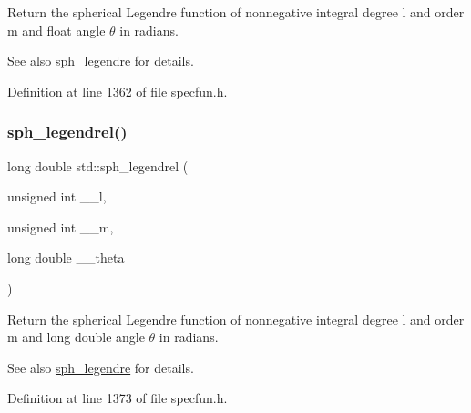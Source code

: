 Return the spherical Legendre function of nonnegative integral degree {\ttfamily l} and order {\ttfamily m} and float angle $ \theta $ in radians.

\begin{DoxySeeAlso}{See also}
\hyperlink{group__mathsf__std_gacef0d41a7ce572a9ace3437498794ed0}{sph\+\_\+legendre} for details. 
\end{DoxySeeAlso}


Definition at line 1362 of file specfun.\+h.

\mbox{\label{group__mathsf__std_ga2f6618dea1847f09fd67f3c974c1910d}} 
\subsubsection{\texorpdfstring{sph\+\_\+legendrel()}{sph\_legendrel()}}
{\footnotesize\ttfamily long double std\+::sph\+\_\+legendrel (\begin{DoxyParamCaption}\item[{unsigned int}]{\+\_\+\+\_\+l,  }\item[{unsigned int}]{\+\_\+\+\_\+m,  }\item[{long double}]{\+\_\+\+\_\+theta }\end{DoxyParamCaption})\hspace{0.3cm}{\ttfamily [inline]}}

Return the spherical Legendre function of nonnegative integral degree {\ttfamily l} and order {\ttfamily m} and {\ttfamily long double} angle $ \theta $ in radians.

\begin{DoxySeeAlso}{See also}
\hyperlink{group__mathsf__std_gacef0d41a7ce572a9ace3437498794ed0}{sph\+\_\+legendre} for details. 
\end{DoxySeeAlso}


Definition at line 1373 of file specfun.\+h.

\mbox{\label{group__mathsf__std_ga01cdd716aaca8ff3c08f307800fd5220}} 
